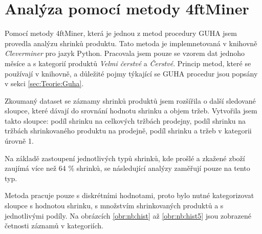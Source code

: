 \chapter{Analýza pomocí metody 4ftMiner}
\label{ch:cleverminer}

Pomocí metody 4ftMiner, která je jednou z metod procedury GUHA jsem provedla analýzu shrinků produktu. Tato metoda je implemnetovaná v  knihovně \emph{Cleverminer} pro jazyk Python. Pracovala jsem pouze se vzorem dat jednoho měsíce a s kategorií produktů \emph{Velmi čerstvé} a \emph{Čerstvé}. Princip metod, které se používají v knihovně, a důležité pojmy týkající se GUHA procedur jsou popsány v sekci \ref*{sec:Teorie:Guha}. 

Zkoumaný dataset se záznamy shrinků produktů jsem rozšířila o další sledované sloupce, které dávají do srovnání hodnotu shrinku a objem tržeb. Vytvořila jsem takto sloupce: podíl shrinku na celkových tržbách prodejny, podíl shrinku na tržbách shrinkovaného produktu na prodejně, podíl shrinku a tržeb v kategorii úrovně 1.

Na základě zastoupení jednotlivých typů shrinků, kde prošlé a zkažené zboží zaujímá více než 64 \% shrinků, se následující analýzy zaměřují pouze na tento typ.

Metoda pracuje pouze s diskrétními hodnotami, proto bylo nutné kategorizovat sloupce s hodnotou shrinku, s množstvím shrinkovaných produktů a s jednotlivými podíly. Na obrázcích \ref*{obr:nb:hist} až \ref{obr:nb:hist5} jsou zobrazené četnosti záznamů v kategoriích.

